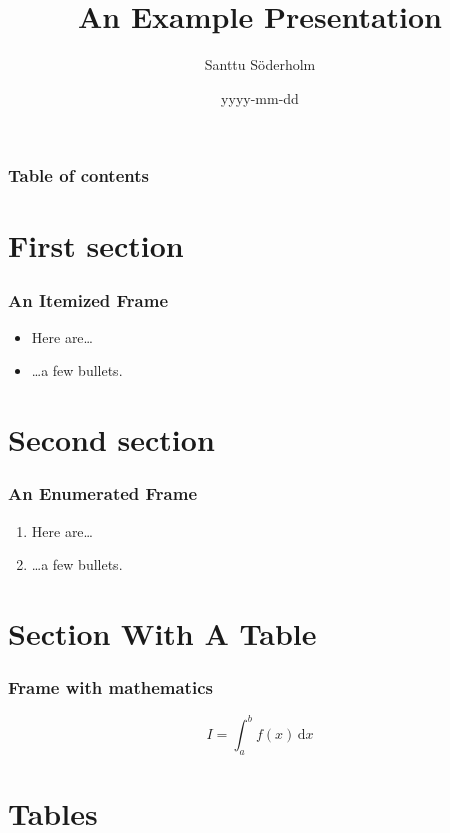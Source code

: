 \documentclass[tikz]{beamer}
\title{An Example Presentation}
\date{yyyy-mm-dd}
\author[Söderholm]{Santtu Söderholm}
\begin{document}
\begin{frame}
\titlepage
\end{frame}

\begin{frame}
\frametitle{Table of contents}
\tableofcontents
\end{frame}

\section{First section}

\begin{frame}
\frametitle{An Itemized Frame}
\begin{itemize}
\item Here are\ldots
\item \ldots a few bullets.
\end{itemize}
\end{frame}

\section{Second section}

\begin{frame}
\frametitle{An Enumerated Frame}
\begin{enumerate}
\item Here are\ldots
\item \ldots a few bullets.
\end{enumerate}
\end{frame}

\section{Section With A Table}

\begin{frame}
\frametitle{Frame with mathematics}
\begin{equation}
I = \int_a^b f(x) \,\mathrm d x
\end{equation}
\end{frame}

\section{Tables}
\end{document}
